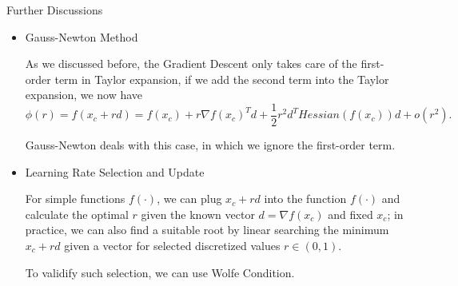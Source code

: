 \documentclass[9pt,handout]{beamer}
\begin{document}
\begin{frame}{Further Discussions}

\begin{itemize}
\item Gauss-Newton Method

As we discussed before, the Gradient Descent only takes care of the first-order term in Taylor expansion, if we add the second term into the Taylor expansion, we now have
$$\phi(r)=f(x_c+rd)=f(x_c)+r\nabla f(x_c)^T d+\frac 12 r^2d^THessian (f(x_c))d+o(r^2).$$

Gauss-Newton deals with this case, in which we ignore the first-order term. 

\item Learning Rate Selection and Update

For simple functions $f(\cdot)$, we can plug $x_c+rd$ into the function $f(\cdot)$ and calculate the optimal $r$  given the known vector $d=\nabla f(x_c)$ and fixed $x_c$; in practice, we can also find a suitable root by linear searching the minimum $x_c+rd$ given a vector for selected discretized values $r\in(0,1)$.

To validify such selection, we can use Wolfe Condition.
\end{itemize}



\end{frame}

\end{document}
